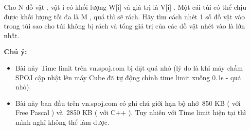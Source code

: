 Cho N đồ vật , vật i có khối lượng W[i] và giá trị là V[i] . Một cái túi có thể chịu được khối lượng tối đa là M , quá thì sẽ rách. Hãy tìm cách nhét 1 số đồ vật vào trong túi sao cho túi không bị rách và tổng giá trị của các đồ vật nhét vào là lớn nhất.

\textbf{Chú ý:}
\begin{itemize}
	\item Bài này Time limit trên vn.spoj.com bị đặt quá nhỏ (lý do là khi máy chấm SPOJ cập nhật lên máy Cube đã tự động chỉnh time limit xuống 0.1s - quá nhỏ).
	\item Bài này ban đầu trên vn.spoj.com có ghi chú giới hạn bộ nhớ 850 KB ( với Free Pascal ) và 2850 KB ( với C++ ). Tuy nhiên với Time limit hiện tại thì mình nghĩ không thể làm được.
\end{itemize}